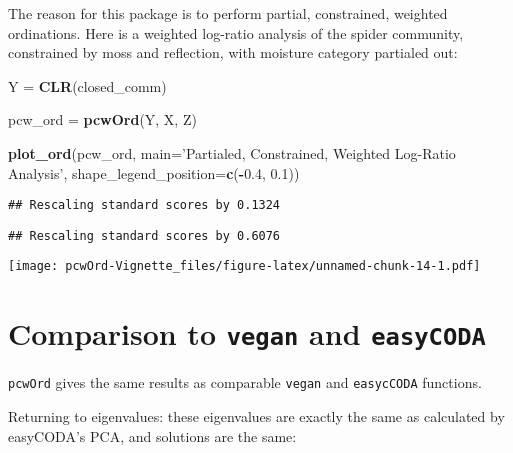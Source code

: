 \documentclass[
]{article}
\newenvironment{Shaded}{\begin{snugshade}}{\end{snugshade}}
\newcommand{\DataTypeTok}[1]{\textcolor[rgb]{0.13,0.29,0.53}{#1}}
\newcommand{\DecValTok}[1]{\textcolor[rgb]{0.00,0.00,0.81}{#1}}
\newcommand{\FloatTok}[1]{\textcolor[rgb]{0.00,0.00,0.81}{#1}}
\newcommand{\KeywordTok}[1]{\textcolor[rgb]{0.13,0.29,0.53}{\textbf{#1}}}
\newcommand{\NormalTok}[1]{#1}
\newcommand{\OperatorTok}[1]{\textcolor[rgb]{0.81,0.36,0.00}{\textbf{#1}}}
\newcommand{\OtherTok}[1]{\textcolor[rgb]{0.56,0.35,0.01}{#1}}
\newcommand{\StringTok}[1]{\textcolor[rgb]{0.31,0.60,0.02}{#1}}
\begin{document}
The reason for this package is to perform partial, constrained, weighted
ordinations. Here is a weighted log-ratio analysis of the spider
community, constrained by moss and reflection, with moisture category
partialed out:

\begin{Shaded}
\begin{Highlighting}[]
\NormalTok{Y =}\StringTok{ }\KeywordTok{CLR}\NormalTok{(closed_comm)}

\NormalTok{pcw_ord =}\StringTok{ }\KeywordTok{pcwOrd}\NormalTok{(Y, X, Z)}

\KeywordTok{plot_ord}\NormalTok{(pcw_ord, }
         \DataTypeTok{main=}\StringTok{'Partialed, Constrained, Weighted Log-Ratio Analysis'}\NormalTok{, }
         \DataTypeTok{shape_legend_position=}\KeywordTok{c}\NormalTok{(}\OperatorTok{-}\FloatTok{0.4}\NormalTok{, }\FloatTok{0.1}\NormalTok{))}
\end{Highlighting}
\end{Shaded}

\begin{verbatim}
## Rescaling standard scores by 0.1324
\end{verbatim}

\begin{verbatim}
## Rescaling standard scores by 0.6076
\end{verbatim}

\texttt{[image: pcwOrd-Vignette\_files/figure-latex/unnamed-chunk-14-1.pdf]}

\hypertarget{comparison-to-vegan-and-easycoda}{%
\section{\texorpdfstring{Comparison to \texttt{vegan} and
\texttt{easyCODA}}{Comparison to vegan and easyCODA}}\label{comparison-to-vegan-and-easycoda}}

\texttt{pcwOrd} gives the same results as comparable \texttt{vegan} and
\texttt{easycCODA} functions.

Returning to eigenvalues: these eigenvalues are exactly the same as
calculated by easyCODA's PCA, and solutions are the same:

\begin{Shaded}
\end{Shaded}
\end{document}
